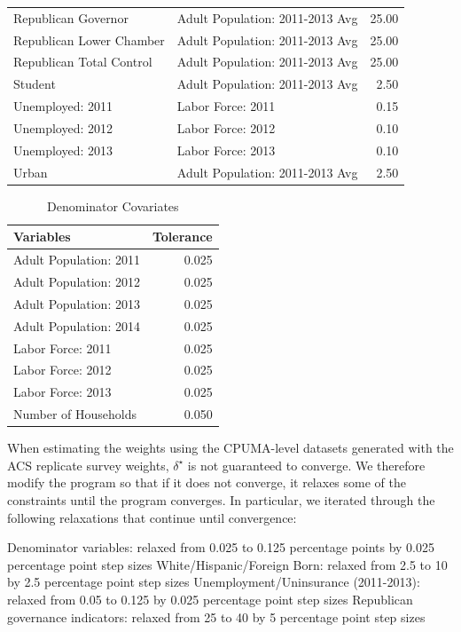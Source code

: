 \documentclass[12pt]{article}
\begin{document}
\begin{table}[ht]
\begin{tabular}{llr}
  Republican Governor & Adult Population: 2011-2013 Avg & 25.00 \\ 
  Republican Lower Chamber & Adult Population: 2011-2013 Avg & 25.00 \\ 
  Republican Total Control & Adult Population: 2011-2013 Avg & 25.00 \\ 
  Student & Adult Population: 2011-2013 Avg & 2.50 \\ 
  Unemployed: 2011 & Labor Force: 2011 & 0.15 \\ 
  Unemployed: 2012 & Labor Force: 2012 & 0.10 \\ 
  Unemployed: 2013 & Labor Force: 2013 & 0.10 \\ 
  Urban & Adult Population: 2011-2013 Avg & 2.50 \\ 
   \hline
\end{tabular}
\end{table}

\begin{table}
\caption{Denominator Covariates}
\centering
\begin{tabular}{lr}
  \hline
Variables & Tolerance \\ 
  \hline
Adult Population: 2011 & 0.025 \\ 
  Adult Population: 2012 & 0.025 \\ 
  Adult Population: 2013 & 0.025 \\ 
  Adult Population: 2014 & 0.025 \\ 
  Labor Force: 2011 & 0.025 \\ 
  Labor Force: 2012 & 0.025 \\ 
  Labor Force: 2013 & 0.025 \\ 
  Number of Households & 0.050 \\ 
   \hline
\end{tabular}
\end{table}

When estimating the weights using the CPUMA-level datasets generated with the ACS replicate survey weights, $\delta^\star$ is not guaranteed to converge. We therefore modify the program so that if it does not converge, it relaxes some of the constraints until the program converges. In particular, we iterated through the  following relaxations that continue until convergence:

Denominator variables: relaxed from 0.025 to 0.125 percentage points by 0.025 percentage point step sizes
White/Hispanic/Foreign Born: relaxed from 2.5 to 10 by 2.5 percentage point step sizes
Unemployment/Uninsurance (2011-2013): relaxed from 0.05 to 0.125 by 0.025 percentage point step sizes
Republican governance indicators: relaxed from 25 to 40 by 5 percentage point step sizes
\end{document}
